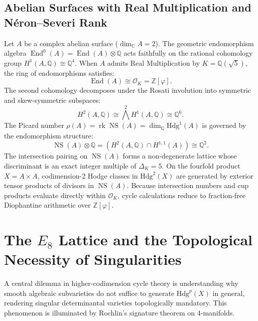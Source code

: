 \documentclass[11pt,reqno]{article}
\theoremstyle{definition}
\DeclareMathOperator{\End}{End}
\DeclareMathOperator{\NS}{NS}
\DeclareMathOperator{\rk}{rk}
\newcommand{\Hdg}{\mathrm{Hdg}}
\begin{document}
\subsection{Abelian Surfaces with Real Multiplication and Néron--Severi Rank}
Let $A$ be a complex abelian surface ($\dim_\mathbb{C} A = 2$). The geometric endomorphism algebra $\End^0(A) = \End(A) \otimes \mathbb{Q}$ acts faithfully on the rational cohomology group $H^1(A, \mathbb{Q}) \cong \mathbb{Q}^4$.
When $A$ admits Real Multiplication by $K = \mathbb{Q}(\sqrt{5})$, the ring of endomorphisms satisfies:
\begin{equation}
\End(A) \cong \mathcal{O}_K = \mathbb{Z}[\varphi].
\end{equation}
The second cohomology decomposes under the Rosati involution into symmetric and skew-symmetric subspaces:
\begin{equation}
H^2(A, \mathbb{Q}) \cong \bigwedge^2 H^1(A, \mathbb{Q}) \cong \mathbb{Q}^6.
\end{equation}
The Picard number $\rho(A) = \rk \NS(A) = \dim_\mathbb{Q} \Hdg^1(A)$ is governed by the endomorphism structure:
\begin{equation}
\NS(A) \otimes \mathbb{Q} = \left(H^2(A, \mathbb{Q}) \cap H^{1,1}(A)\right) \cong \mathbb{Q}^2.
\end{equation}
The intersection pairing on $\NS(A)$ forms a non-degenerate lattice whose discriminant is an exact integer multiple of $\Delta_K = 5$. On the fourfold product $X = A \times A$, codimension-2 Hodge classes in $\Hdg^2(X)$ are generated by exterior tensor products of divisors in $\NS(A)$. Because intersection numbers and cup products evaluate directly within $\mathcal{O}_K$, cycle calculations reduce to fraction-free Diophantine arithmetic over $\mathbb{Z}[\varphi]$.

\section{The $E_8$ Lattice and the Topological Necessity of Singularities}

A central dilemma in higher-codimension cycle theory is understanding why smooth algebraic subvarieties do not suffice to generate $\Hdg^p(X)$ in general, rendering singular determinantal varieties topologically mandatory. This phenomenon is illuminated by Rochlin's signature theorem on 4-manifolds.
\end{document}
